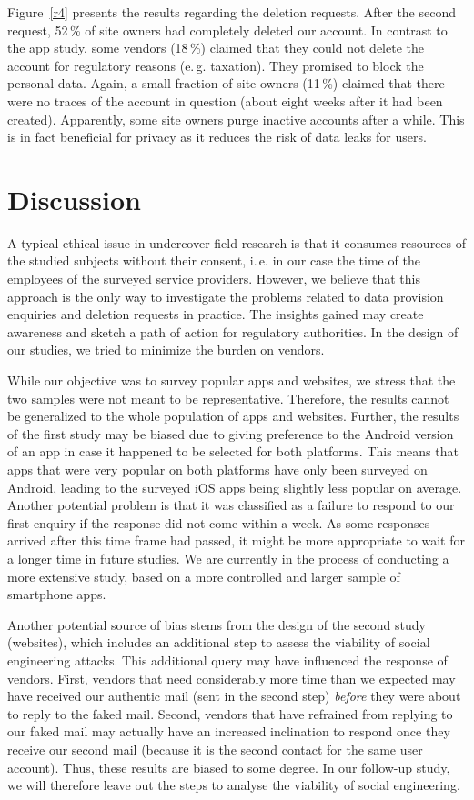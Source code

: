 \documentclass{llncs}
\begin{document}
Figure~\ref{r4} presents the results regarding the deletion requests. After the second request, 52\,\% of site owners had completely deleted our account. In contrast to the app study, some vendors (18\,\%) claimed that they could not delete the account for regulatory reasons (e.\,g. taxation). They promised to block the personal data. Again, a small fraction of site owners (11\,\%) claimed that there were no traces of the account in question (about eight weeks after it had been created). Apparently, some site owners purge inactive accounts after a while. This is in fact beneficial for privacy as it reduces the risk of data leaks for users.

\section{Discussion}

A typical ethical issue in undercover field research is that it consumes resources of the studied subjects without their consent, i.\,e. in our case the time of the employees of the surveyed service providers. However, we believe that this approach is the only way to investigate the problems related to data provision enquiries and deletion requests in practice. The insights gained may create awareness and sketch a path of action for regulatory authorities. In the design of our studies, we tried to minimize the burden on vendors.

While our objective was to survey popular apps and websites, we stress that the two samples were not meant to be representative. Therefore, the results cannot be generalized to the whole population of apps and websites. Further, the results of the first study may be biased due to giving preference to the Android version of an app in case it happened to be selected for both platforms. This means that apps that were very popular on both platforms have only been surveyed on Android, leading to the surveyed iOS apps being slightly less popular on average. Another potential problem is that it was classified as a failure to respond to our first enquiry if the response did not come within a week. As some responses arrived after this time frame had passed, it might be more appropriate to wait for a longer time in future studies. We are currently in the process of conducting a more extensive study, based on a more controlled and larger sample of smartphone apps.

Another potential source of bias stems from the design of the second study (websites), which includes an additional step to assess the viability of social engineering attacks. This additional query may have influenced the response of vendors. First, vendors that need considerably more time than we expected may have received our authentic mail (sent in the second step) \emph{before} they were about to reply to the faked mail. Second, vendors that have refrained from replying to our faked mail may actually have an increased inclination to respond once they receive our second mail (because it is the second contact for the same user account). Thus, these results are biased to some degree. In our follow-up study, we will therefore leave out the steps to analyse the viability of social engineering.
\end{document}

